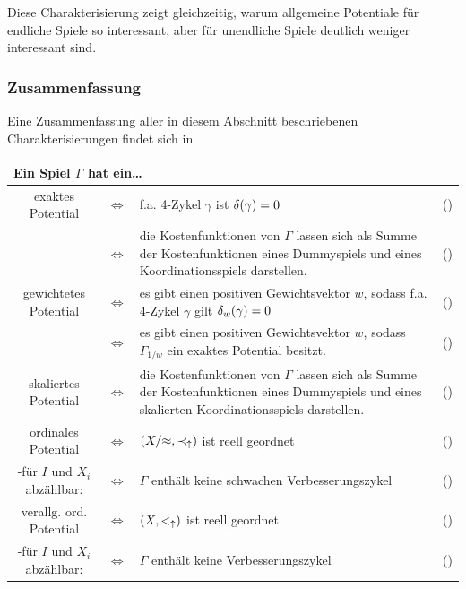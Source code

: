 Diese Charakterisierung zeigt gleichzeitig, warum allgemeine Potentiale für endliche Spiele so interessant, aber für unendliche Spiele deutlich weniger interessant sind. 

\subsubsection{Zusammenfassung}

Eine Zusammenfassung aller in diesem Abschnitt beschriebenen Charakterisierungen findet sich in 

\begin{table}\centering\renewcommand*{\arraystretch}{1.2}
	\begin{tabularx}{\textwidth}{ccXr}
		\multicolumn{4}{l}{Ein Spiel $\Gamma$ hat ein\dots} \\\hline\hline
		exaktes Potential 				& $\iff$	& f.a. 4-Zykel $\gamma$ ist $\delta(\gamma)=0$	
		& (\Cref{satz:CharExPot}) 	\\
										& $\iff$	& die Kostenfunktionen von $\Gamma$ lassen sich als Summe der Kostenfunktionen eines Dummyspiels und eines
		Koordinationsspiels darstellen.
		& (\Cref{satz:CharExPotAlt})\\\hline
		gewichtetes Potential			& $\iff$	& es gibt einen positiven Gewichtsvektor $w$, sodass f.a. 4-Zykel $\gamma$ gilt $\delta_w(\gamma)=0$	
		& (\Cref{satz:CharGewPot})	\\
										& $\iff$	& es gibt einen positiven Gewichtsvektor $w$, sodass $\Gamma_{1/w}$ ein exaktes Potential besitzt.	
		& (\Cref{beob:ZshExGewPot})	\\\hline
		skaliertes Potential			& $\iff$	& die Kostenfunktionen von $\Gamma$ lassen sich als Summe der Kostenfunktionen eines Dummyspiels und eines skalierten Koordinationsspiels darstellen.
		& (\Cref{satz:CharSkalPot})	\\\hline
		ordinales Potential				& $\iff$	& $(X/{\approx}, \prec_\uparrow)$ ist reell geordnet
		& (\Cref{satz:CharOrdPot})	\\
		-für $I$ und $X_i$ abzählbar:	& $\iff$	& $\Gamma$ enthält keine schwachen Verbesserungszykel 
		& (\Cref{kor:CharExOrdPotabzIundXi})\\\hline
		verallg. ord. Potential			& $\iff$	& $(X, <_\uparrow)$ ist reell geordnet
		& (\Cref{satz:CharVerallOrdPot})\\
		-für $I$ und $X_i$ abzählbar:	& $\iff$	& $\Gamma$ enthält keine Verbesserungszykel
		& (\Cref{kor:CharExVerOrdPotabzIundXi})\\

\end{tabularx}
\end{table}
